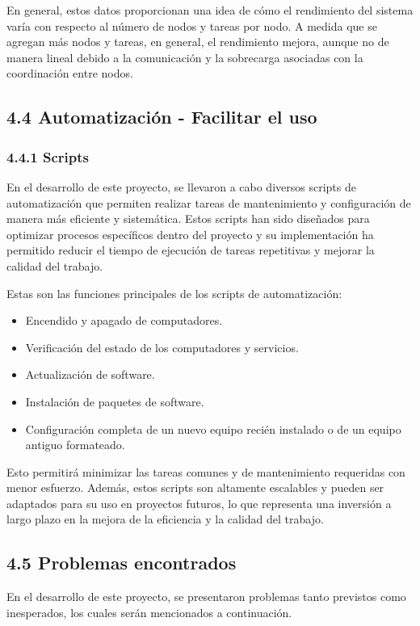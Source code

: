 \begin{spacing}{1.5}
En general, estos datos proporcionan una idea de cómo el rendimiento del sistema varía con respecto al número de nodos y tareas por nodo. A medida que se agregan más nodos y tareas, en general, el rendimiento mejora, aunque no de manera lineal debido a la comunicación y la sobrecarga asociadas con la coordinación entre nodos.

  \subsection{4.4 Automatización - Facilitar el uso}   \label{chap:4.4}

  \subsubsection{4.4.1 Scripts}

  En el desarrollo de este proyecto, se llevaron a cabo diversos scripts de
  automatización que permiten realizar tareas de mantenimiento y configuración
  de
  manera más eficiente y sistemática. Estos scripts han sido diseñados para
  optimizar procesos específicos dentro del proyecto y su implementación ha
  permitido reducir el tiempo de ejecución de tareas repetitivas y mejorar la
  calidad del trabajo.

  Estas son las funciones principales de los scripts de automatización:

  \begin{itemize}
    \item Encendido y apagado de computadores.
    \item Verificación del estado de los computadores y servicios.
    \item Actualización de software.
    \item Instalación de paquetes de software.
    \item Configuración completa de un nuevo equipo recién instalado o de
          un equipo antiguo formateado.
  \end{itemize}

  Esto permitirá minimizar las tareas comunes y de mantenimiento requeridas
  con menor esfuerzo. Además, estos scripts son altamente escalables y pueden
  ser
  adaptados para su uso en proyectos futuros, lo que representa una inversión a
  largo plazo en la mejora de la eficiencia y la calidad del trabajo.\cite{github}

  \subsection{4.5 Problemas encontrados}
  En el desarrollo de este proyecto, se presentaron problemas tanto previstos
  como inesperados, los cuales serán mencionados a continuación.


\end{spacing}

